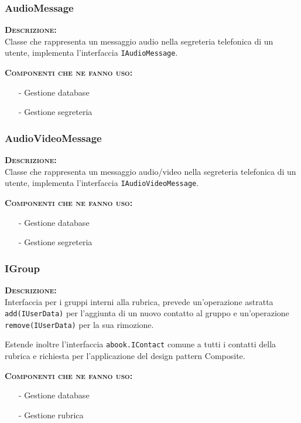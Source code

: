 \subsubsection{AudioMessage}
\begin{description}
	\item{\scshape\bfseries Descrizione:}\\
Classe che rappresenta un messaggio audio nella segreteria telefonica di un utente, implementa l'interfaccia \texttt{IAudioMessage}.
	\item{\scshape\bfseries Componenti che ne fanno uso:}
	  \begin{itemize}[noitemsep,nolistsep]
	    \item[-] Gestione database
	    \item[-] Gestione segreteria
	  \end{itemize}
\end{description}

\subsubsection{AudioVideoMessage}
\begin{description}
	\item{\scshape\bfseries Descrizione:}\\
Classe che rappresenta un messaggio audio/video nella segreteria telefonica di un utente, implementa l'interfaccia \texttt{IAudioVideoMessage}.
	\item{\scshape\bfseries Componenti che ne fanno uso:}
	  \begin{itemize}[noitemsep,nolistsep]
	    \item[-] Gestione database
	    \item[-] Gestione segreteria
	  \end{itemize}
\end{description}

\subsubsection{IGroup}
\begin{description}
	\item{\scshape\bfseries Descrizione:}\\
Interfaccia per i gruppi interni alla rubrica, prevede un'operazione astratta \texttt{add(IUserData)} per l'aggiunta di un nuovo contatto al gruppo e un'operazione \texttt{remove(IUserData)} per la sua rimozione.

Estende inoltre l'interfaccia \texttt{abook.IContact} comune a tutti i contatti della rubrica e richiesta per l'applicazione del design pattern Composite.
	\item{\scshape\bfseries Componenti che ne fanno uso:} 
	  \begin{itemize}[noitemsep,nolistsep]
	    \item[-] Gestione database
	    \item[-] Gestione rubrica
	  \end{itemize}
\end{description}

